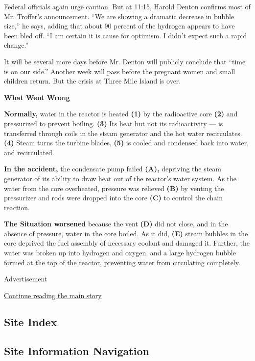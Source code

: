 Federal officials again urge caution. But at 11:15, Harold Denton
confirms most of Mr. Troffer's announcement. ``We are showing a dramatic
decrease in bubble size,'' he says, adding that about 90 percent of the
hydrogen appears to have been bled off. ``I am certain it is cause for
optimism. I didn't expect such a rapid change.''

It will be several more days before Mr. Denton will publicly conclude
that ``time is on our side.'' Another week will pass before the pregnant
women and small children return. But the crisis at Three Mile Island is
over.

\textbf{What Went Wrong}

\textbf{Normally,} water in the reactor is heated \textbf{(1)} by the
radioactive core \textbf{(2)} and pressurized to prevent boiling.
\textbf{(3)} Its heat but not its radioactivity --- is transferred
through coils in the steam generator and the hot water recirculates.
\textbf{(4)} Steam turns the turbine blades, \textbf{(5)} is cooled and
condensed back into water, and recirculated.

\textbf{In the accident,} the condensate pump failed \textbf{(A),}
depriving the steam generator of its ability to draw heat out of the
reactor's water system. As the water from the core overheated, pressure
was relieved \textbf{(B)} by venting the pressurizer and rods were
dropped into the core \textbf{(C)} to control the chain reaction.

\textbf{The Situation worsened} because the vent \textbf{(D)} did not
close, and in the absence of pressure, water in the core boiled. As it
did, \textbf{(E)} steam bubbles in the core deprived the fuel assembly
of necessary coolant and damaged it. Further, the water was broken up
into hydrogen and oxygen, and a large hydrogen bubble formed at the top
of the reactor, preventing water from circulating completely.

Advertisement

\protect\hyperlink{after-bottom}{Continue reading the main story}

\hypertarget{site-index}{%
\subsection{Site Index}\label{site-index}}

\hypertarget{site-information-navigation}{%
\subsection{Site Information
Navigation}\label{site-information-navigation}}

